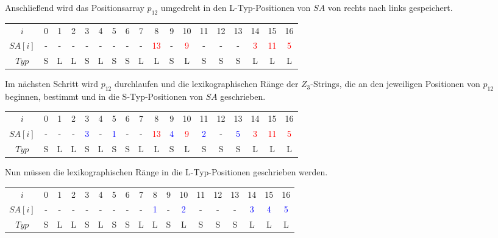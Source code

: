 Anschließend wird das Positionsarray $p_{12}$ umgedreht in den L-Typ-Positionen von $SA$ von rechts nach links gespeichert.

\begin{table}[H]
	\footnotesize
	\centering
	\begin{tabular}{c| c c c c c c c c c c c c c c c c c}
		$i$ & 0 & 1 & 2 & 3 & 4 & 5 & 6 & 7 & 8 & 9 & 10 & 11 & 12 & 13 & 14 & 15 & 16 \\
		$SA[i]$ & - & - & - & - & - & - & - & - & \textcolor{red}{13} & - & \textcolor{red}{9} & - & - & - & \textcolor{red}{3} & \textcolor{red}{11} & \textcolor{red}{5} \\
		$Typ$ & S & L & L & S & L & S & S & L & L & S & L & S & S & S & L & L & L
	\end{tabular}
\end{table}

Im nächsten Schritt wird $p_{12}$ durchlaufen und die lexikographischen Ränge der $Z_3$-Strings, die an den jeweiligen Positionen von $p_{12}$ beginnen, bestimmt und in die S-Typ-Positionen von $SA$ geschrieben.

\begin{table}[H]
	\footnotesize
	\centering
	\begin{tabular}{c| c c c c c c c c c c c c c c c c c}
		$i$ & 0 & 1 & 2 & 3 & 4 & 5 & 6 & 7 & 8 & 9 & 10 & 11 & 12 & 13 & 14 & 15 & 16 \\
		$SA[i]$ & - & - & - & \textcolor{blue}{3} & - & \textcolor{blue}{1} & - & - & \textcolor{red}{13} & \textcolor{blue}{4} & \textcolor{red}{9} & \textcolor{blue}{2} & - & \textcolor{blue}{5} & \textcolor{red}{3} & \textcolor{red}{11} & \textcolor{red}{5} \\
		$Typ$ & S & L & L & S & L & S & S & L & L & S & L & S & S & S & L & L & L
	\end{tabular}
\end{table}

Nun müssen die lexikographischen Ränge in die L-Typ-Positionen geschrieben werden.

\begin{table}[H]
	\footnotesize
	\centering
	\begin{tabular}{c| c c c c c c c c c c c c c c c c c}
		$i$ & 0 & 1 & 2 & 3 & 4 & 5 & 6 & 7 & 8 & 9 & 10 & 11 & 12 & 13 & 14 & 15 & 16 \\
		$SA[i]$ & - & - & - & - & - & - & - & - & \textcolor{blue}{1} & - & \textcolor{blue}{2} & - & - & - & \textcolor{blue}{3} & \textcolor{blue}{4} & \textcolor{blue}{5} \\
		$Typ$ & S & L & L & S & L & S & S & L & L & S & L & S & S & S & L & L & L
	\end{tabular}
\end{table}

